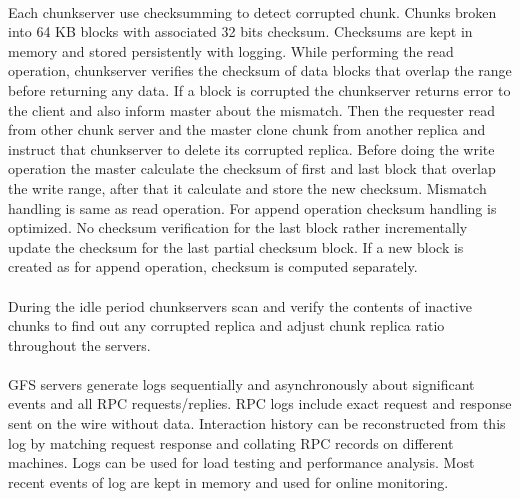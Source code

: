 \documentclass[8pt]{extarticle}
\begin{document}
	\paragraph{}
	Each chunkserver use checksumming to detect corrupted chunk. Chunks broken into 64 KB blocks with associated 32 bits checksum. Checksums are kept in memory and stored persistently with logging. While performing  the read operation, chunkserver verifies the checksum of data blocks that overlap the range before returning any data. If a block is corrupted the chunkserver returns error to the client and also inform master about the mismatch. Then the requester read from other chunk server and the master clone chunk from another replica and instruct that chunkserver to delete its corrupted replica. Before doing the write operation the master calculate the checksum of first and last block that overlap the write range, after that it calculate and store the new checksum. Mismatch handling is same as read operation. For append operation checksum handling is optimized. No checksum verification for the last block rather incrementally update the checksum for the last partial checksum block. If a new block is created as for append operation, checksum is computed separately.
	
	\paragraph{}
	During the idle period chunkservers scan and verify the contents of inactive chunks to find out any corrupted replica and adjust chunk replica ratio throughout the servers.
	
	\paragraph{}
	GFS servers generate logs sequentially and asynchronously about significant events and all RPC requests/replies. RPC logs include exact request and response sent on the wire without data. Interaction history can be reconstructed from this log by matching request response and collating RPC records on different machines. Logs can be used for load testing and performance analysis. Most recent events of log are kept in memory and used for online monitoring. 
\end{document}
